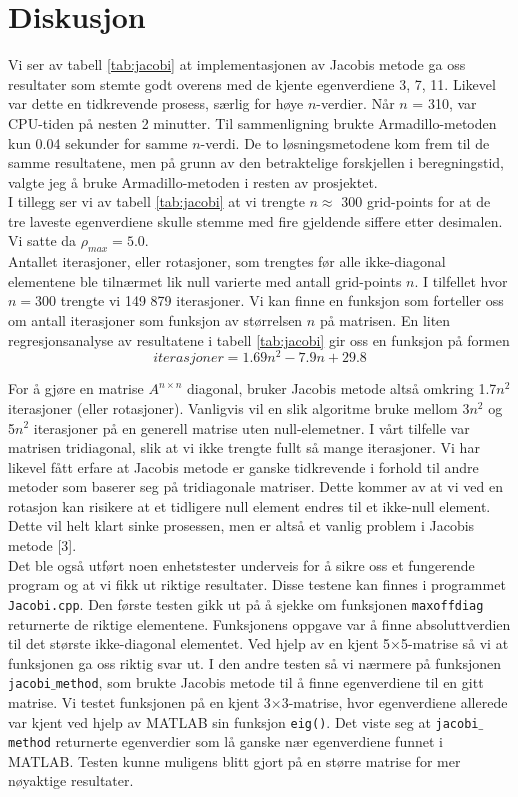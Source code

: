 \documentclass{article}
\begin{document}
\section{Diskusjon}
Vi ser av tabell \ref{tab:jacobi} at implementasjonen av Jacobis metode ga oss resultater som stemte godt overens med de kjente egenverdiene {3, 7, 11}. Likevel var dette en tidkrevende prosess, særlig for høye $n$-verdier. Når $n$ = 310, var CPU-tiden på nesten 2 minutter. Til sammenligning brukte Armadillo-metoden kun 0.04 sekunder for samme $n$-verdi. De to løsningsmetodene kom frem til de samme resultatene, men på grunn av den betraktelige forskjellen i beregningstid, valgte jeg å bruke Armadillo-metoden i resten av prosjektet. \\

I tillegg ser vi av tabell \ref{tab:jacobi} at vi trengte $n \approx$ 300 grid-points for at de tre laveste egenverdiene skulle stemme med fire gjeldende siffere etter desimalen. Vi satte da $\rho_{max} = 5.0$.\\

Antallet iterasjoner, eller rotasjoner, som trengtes før alle ikke-diagonal elementene ble tilnærmet lik null varierte med antall grid-points $n$. I tilfellet hvor $n = 300$ trengte vi 149 879 iterasjoner. Vi kan finne en funksjon som forteller oss om antall iterasjoner som funksjon av størrelsen $n$ på matrisen. En liten regresjonsanalyse av resultatene i tabell \ref{tab:jacobi} gir oss en funksjon på formen
\[ iterasjoner = 1.69n^2 - 7.9n + 29.8 \] 

For å gjøre en matrise $A^{n \times n}$ diagonal, bruker Jacobis metode altså omkring 1.7$n^2$ iterasjoner (eller rotasjoner). Vanligvis vil en slik algoritme bruke mellom 3$n^2$ og 5$n^2$ iterasjoner på en generell matrise uten null-elemetner. I vårt tilfelle var matrisen tridiagonal, slik at vi ikke trengte fullt så mange iterasjoner. Vi har likevel fått erfare at Jacobis metode er ganske tidkrevende i forhold til andre metoder som baserer seg på tridiagonale matriser. Dette kommer av at vi ved en rotasjon kan risikere at et tidligere null element endres til et ikke-null element. Dette vil helt klart sinke prosessen, men er altså et vanlig problem i Jacobis metode [3].\\
 
Det ble også utført noen enhetstester underveis for å sikre oss et fungerende program og at vi fikk ut riktige resultater. Disse testene kan finnes i programmet \texttt{Jacobi.cpp}. Den første testen gikk ut på å sjekke om funksjonen \texttt{maxoffdiag} returnerte de riktige elementene. Funksjonens oppgave var å finne absoluttverdien til det største ikke-diagonal elementet. Ved hjelp av en kjent 5$\times$5-matrise så vi at funksjonen ga oss riktig svar ut. I den andre testen så vi nærmere på funksjonen \texttt{jacobi$\_$method}, som brukte Jacobis metode til å finne egenverdiene til en gitt matrise. Vi testet funksjonen på en kjent 3$\times$3-matrise, hvor egenverdiene allerede var kjent ved hjelp av MATLAB sin funksjon \texttt{eig()}. Det viste seg at \texttt{jacobi$\_$method} returnerte egenverdier som lå ganske nær egenverdiene funnet i MATLAB. Testen kunne muligens blitt gjort på en større matrise for mer nøyaktige resultater.\\
\end{document}
